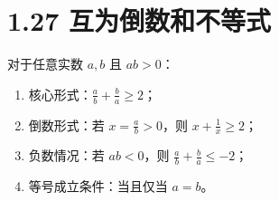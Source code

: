\documentclass{article}
\begin{document}
\section*{1.27 互为倒数和不等式}
对于任意实数 \( a,b \) 且 \( ab>0 \)：
\begin{enumerate}
    \item 核心形式：\( \frac{a}{b}+\frac{b}{a} \geq 2 \)；
    \item 倒数形式：若 \( x=\frac{a}{b}>0 \)，则 \( x+\frac{1}{x} \geq 2 \)；
    \item 负数情况：若 \( ab<0 \)，则 \( \frac{a}{b}+\frac{b}{a} \leq -2 \)；
    \item 等号成立条件：当且仅当 \( a=b \)。
\end{enumerate}
\end{document}
